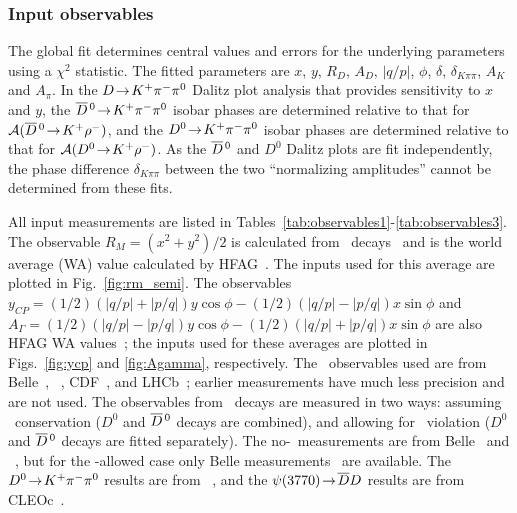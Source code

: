 \subsubsection{Input observables}

The global fit determines central values and errors for
the underlying parameters using a $\chi^2$ statistic.
The fitted parameters are $x$, $y$, $R^{}_D$, $A^{}_D$,
$|q/p|$, $\phi$, $\delta$, $\delta^{}_{K\pi\pi}$,
$A^{}_K$ and $A^{}_\pi$.
In the $D\!\rightarrow\! K^+\pi^-\pi^0$ 
Dalitz plot analysis that provides sensitivity to $x$ and $y$, 
the $\overline{D}{}^{\,0}\!\rightarrow\! K^+\pi^-\pi^0$ isobar phases are determined 
relative to that for ${\cal A}(\overline{D}{}^{\,0}\!\rightarrow\! K^+\rho^-)$, and 
the $D^0\!\rightarrow\! K^+\pi^-\pi^0$ isobar phases are determined 
relative to that for ${\cal A}(D^0\!\rightarrow\! K^+\rho^-)$. 
As the $\overline{D}{}^{\,0}$ and $D^0$ Dalitz plots are fit independently, 
the phase difference $\delta^{}_{K\pi\pi}$ between the
two ``normalizing amplitudes'' cannot be determined
from these fits.

All input measurements are listed in 
Tables~\ref{tab:observables1}-\ref{tab:observables3}. 
The observable $R^{}_M=(x^2+y^2)/2$ is calculated from \dklnu\ 
decays~\cite{Aitala:1996vz,Cawlfield:2005ze,Aubert:2007aa,Bitenc:2008bk}
and is the world average (WA) value calculated by 
HFAG~\cite{HFAG_charm:webpage}. The inputs used for
this average are plotted in Fig.~\ref{fig:rm_semi}.
The observables 
$y^{}_{CP}= (1/2)(|q/p| + |p/q|)y\cos\phi - (1/2)(|q/p|-|p/q|)x\sin\phi$ 
and 
$A^{}_\Gamma= (1/2)(|q/p| - |p/q|)y\cos\phi - (1/2)(|q/p|+|p/q|)x\sin\phi$ 
are also HFAG WA values~\cite{HFAG_charm:webpage}; the inputs
used for these averages are plotted in
Figs.~\ref{fig:ycp} and \ref{fig:Agamma}, respectively.
The \dkpi\ observables used are from 
Belle~\cite{Zhang:2006dp,Ko:2014qvu}, 
\babar~\cite{Aubert:2007wf}, 
CDF~\cite{Aaltonen:2013pja}, and
LHCb~\cite{Aaij:2013wda};
earlier measurements have much less precision and are not used.
The observables from \dkspp\ decays are measured in two ways:
assuming \cp\ conservation ($D^0$ and $\overline{D}{}^{\,0}$ decays are combined),
and allowing for \cp\ violation ($D^0$ and $\overline{D}{}^{\,0}$ decays are
fitted separately). The no-\cpv\ measurements are from 
Belle~\cite{Peng:2014oda} and \babar~\cite{delAmoSanchez:2010xz}, 
but for the \cpv-allowed case only Belle 
measurements~\cite{Peng:2014oda} are available. The 
$D^0\!\rightarrow\! K^+\pi^-\pi^0$ results are from \babar~\cite{Aubert:2008zh},
and the $\psi(3770)\!\rightarrow\!\overline{D}D$ results are from 
CLEOc~\cite{Asner:2012xb}.


